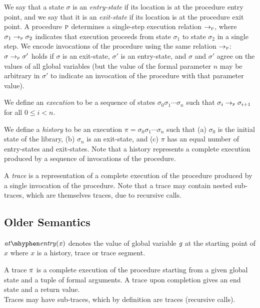 We say that a state $\sigma$ is an \emph{entry-state} if its location is at the procedure entry point,
and we say that it is an \emph{exit-state} if its location is at the procedure exit point.
A procedure $\textsc{p}$ determines a single-step execution relation $\rightarrow_{\textsc{p}}$, where $\sigma_1 \rightarrow_{\textsc{p}} \sigma_2$ indicates
that execution proceeds from state $\sigma_1$ to state $\sigma_2$ in a single step.
We encode invocations of the procedure using the same relation $\rightarrow_{\textsc{p}}$: 
$\sigma \rightarrow_{\textsc{p}} \sigma'$  holds if $\sigma$ is an exit-state, $\sigma'$ is an entry-state,
and $\sigma$ and $\sigma'$ agree on the values of all global variables (but the value of the formal
parameter $n$ may be arbitrary in $\sigma'$ to indicate an invocation of the procedure with that
parameter value).

We define an \emph{execution} to be a sequence of states $\sigma_0 \sigma_1 \cdots \sigma_n$ such that
$\sigma_i \rightarrow_{\textsc{p}} \sigma_{i+1}$ for all $0 \leq i < n$.

We define a \emph{history} to be an execution $\pi = \sigma_0 \sigma_1 \cdots \sigma_n$ such that
(a) $\sigma_0$ is the initial state of the library,
(b) $\sigma_n$ is an exit-state, and
(c) $\pi$ has an equal number of entry-states and exit-states.
Note that a history represents a complete  execution produced by a
sequence of invocations of the procedure.

A \emph{trace} is a representation of a complete execution of the procedure produced by a single
invocation of the procedure. Note that a trace may contain nested sub-traces,
which are themselves traces, due to recursive calls.


\subsection{Older Semantics}

\begin{definition} 
  $\\\atEntry{x}$ denotes the value of global variable $\textit{g}$ at the
  starting point of $x$ where $x$ is a history, trace or trace
  segment.
\end{definition}

\begin{definition}[trace]
  A trace $\pi$ is a complete execution of the procedure starting
  from a given global state and a tuple of formal arguments. A trace
  upon completion gives an end state and a return value.\\ Traces may
  have sub-traces, which by definition are traces (recursive calls).
\end{definition}

